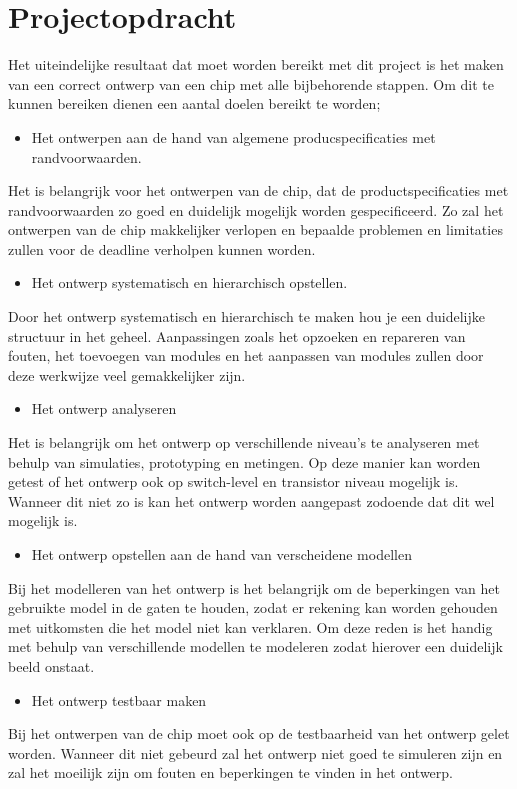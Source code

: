 \documentclass{scrartcl}
\begin{document}
\section{Projectopdracht}
Het uiteindelijke resultaat dat moet worden bereikt met dit project is het maken van een correct ontwerp van een chip met alle bijbehorende stappen. Om dit te kunnen bereiken dienen een aantal doelen bereikt te worden;
\begin {itemize}
\item Het ontwerpen aan de hand van algemene producspecificaties met randvoorwaarden.
\end {itemize}
\quad Het is belangrijk voor het ontwerpen van de chip, dat de productspecificaties met randvoorwaarden zo goed en duidelijk mogelijk worden gespecificeerd. 
Zo zal het ontwerpen van de chip makkelijker verlopen en bepaalde problemen en limitaties zullen voor de deadline verholpen kunnen worden.
\begin {itemize}
\item Het ontwerp systematisch en hierarchisch opstellen.
\end {itemize}
\quad Door het ontwerp systematisch en hierarchisch te maken hou je een duidelijke structuur in het geheel. Aanpassingen zoals het opzoeken en repareren van fouten, het toevoegen van modules en het aanpassen van modules zullen door deze werkwijze veel gemakkelijker zijn.
\begin {itemize}
\item Het ontwerp analyseren 
\end {itemize}
\quad Het is belangrijk om het ontwerp op verschillende niveau's te analyseren met behulp van simulaties, prototyping en metingen. Op deze manier kan worden getest of het ontwerp ook op switch-level en transistor niveau mogelijk is. Wanneer dit niet zo is kan het ontwerp worden aangepast zodoende dat dit wel mogelijk is.
\begin {itemize}
\item Het ontwerp opstellen aan de hand van verscheidene modellen
\end {itemize}
\quad Bij het modelleren van het ontwerp is het belangrijk om de beperkingen van het gebruikte model in de gaten te houden, zodat er rekening kan worden gehouden met uitkomsten die het model niet kan verklaren. Om deze reden is het handig met behulp van verschillende modellen te modeleren zodat hierover een duidelijk beeld onstaat.
\begin {itemize}
\item Het ontwerp testbaar maken
\end {itemize}
\quad Bij het ontwerpen van de chip moet ook op de testbaarheid van het ontwerp gelet worden. Wanneer dit niet gebeurd zal het ontwerp niet goed te simuleren zijn en zal het moeilijk zijn om fouten en beperkingen te vinden in het ontwerp.
\end{document}
